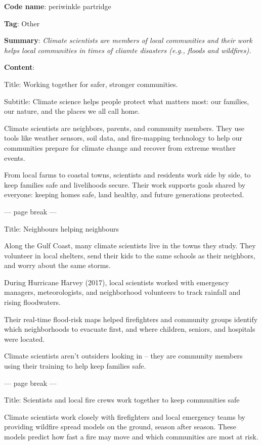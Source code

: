 \documentclass[
  letterpaper,
  DIV=11,
  numbers=noendperiod]{scrartcl}
\begin{document}
\textbf{Code name}: periwinkle partridge

\textbf{Tag}: Other

\textbf{Summary}: \emph{Climate scientists are members of local
communities and their work helps local communities in times of cliamte
disasters (e.g., floods and wildfires).}

\textbf{Content}:

Title: Working together for safer, stronger communities.

Subtitle: Climate science helps people protect what matters most: our
families, our nature, and the places we all call home.

Climate scientists are neighbors, parents, and community members. They
use tools like weather sensors, soil data, and fire-mapping technology
to help our communities prepare for climate change and recover from
extreme weather events.

From local farms to coastal towns, scientists and residents work side by
side, to keep families safe and livelihoods secure. Their work supports
goals shared by everyone: keeping homes safe, land healthy, and future
generations protected.

--- page break ---

Title: Neighbours helping neighbours

Along the Gulf Coast, many climate scientists live in the towns they
study. They volunteer in local shelters, send their kids to the same
schools as their neighbors, and worry about the same storms.

During Hurricane Harvey (2017), local scientists worked with emergency
managers, meteorologists, and neighborhood volunteers to track rainfall
and rising floodwaters.

Their real-time flood-risk maps helped firefighters and community groups
identify which neighborhoods to evacuate first, and where children,
seniors, and hospitals were located.

Climate scientists aren't outsiders looking in -- they are community
members using their training to help keep families safe.

--- page break ---

Title: Scientists and local fire crews work together to keep communities
safe

Climate scientists work closely with firefighters and local emergency
teams by providing wildfire spread models on the ground, season after
season. These models predict how fast a fire may move and which
communities are most at risk.
\end{document}
